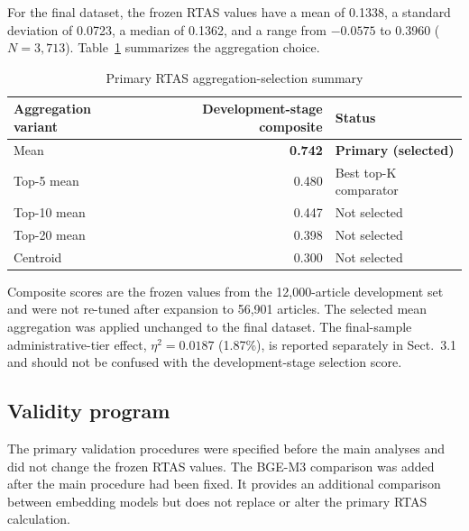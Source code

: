\documentclass[pdflatex,sn-apa]{sn-jnl}
\begin{document}
For the final dataset, the frozen RTAS values have a mean of 0.1338, a standard deviation of 0.0723, a median of 0.1362, and a range from $-0.0575$ to 0.3960 ($N=3{,}713$). Table~\ref{tab:selection} summarizes the aggregation choice.

\begin{table}[htbp]
\centering
\caption{Primary RTAS aggregation-selection summary}
\label{tab:selection}
\begin{tabular}{lrl}
\toprule
Aggregation variant & Development-stage composite & Status\\
\midrule
Mean & \textbf{0.742} & \textbf{Primary (selected)}\\
Top-5 mean & 0.480 & Best top-K comparator\\
Top-10 mean & 0.447 & Not selected\\
Top-20 mean & 0.398 & Not selected\\
Centroid & 0.300 & Not selected\\
\bottomrule
\end{tabular}
\begin{tablenotes}\footnotesize
\item Composite scores are the frozen values from the 12,000-article development set and were not re-tuned after expansion to 56,901 articles. The selected mean aggregation was applied unchanged to the final dataset. The final-sample administrative-tier effect, $\eta^2=0.0187$ (1.87\%), is reported separately in Sect.~3.1 and should not be confused with the development-stage selection score.
\end{tablenotes}
\end{table}

\subsection{Validity program}

The primary validation procedures were specified before the main analyses and did not change the frozen RTAS values. The BGE-M3 comparison was added after the main procedure had been fixed. It provides an additional comparison between embedding models but does not replace or alter the primary RTAS calculation.
\end{document}
